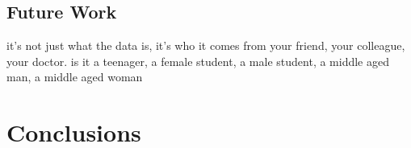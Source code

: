 \documentclass{sigchi}
\begin{document}
\subsection{Future Work}

it's not just what the data is, it's who it comes from {your friend, your colleague, your doctor}. is it {a teenager, a female student, a male student, a middle aged man, a middle aged woman}


\section{Conclusions}




\end{document}
